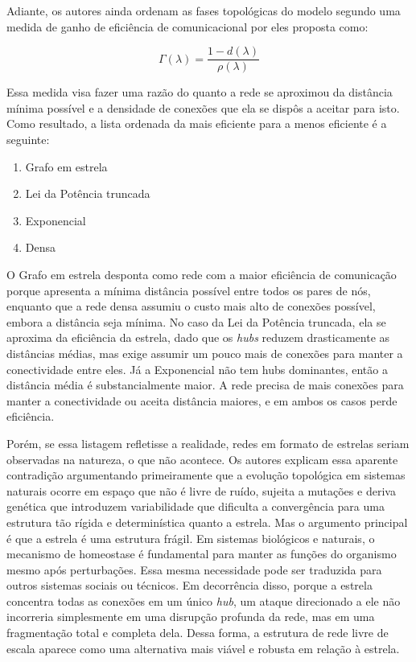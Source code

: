 \documentclass[12pt,oneside,a4paper,brazil,sumario=tradicional]{abntex2}
\begin{document}
Adiante, os autores ainda ordenam as fases topológicas do modelo segundo uma medida de ganho de eficiência de comunicacional por eles proposta como:

\[\Gamma(\lambda) = \frac{1-d(\lambda)}{\rho(\lambda)}\]

Essa medida visa fazer uma razão do quanto a rede se aproximou da distância mínima possível e a densidade de conexões que ela se dispôs a aceitar para isto. Como resultado, a lista ordenada da mais eficiente para a menos eficiente é a seguinte:

\begin{enumerate}
  \item Grafo em estrela
  \item Lei da Potência truncada
  \item Exponencial
  \item Densa
\end{enumerate}
O Grafo em estrela desponta como rede com a maior eficiência de comunicação porque apresenta a mínima distância possível entre todos os pares de nós, enquanto que a rede densa assumiu o custo mais alto de conexões possível, embora a distância seja mínima. No caso da Lei da Potência truncada, ela se aproxima da eficiência da estrela, dado que os \textit{hubs }reduzem drasticamente as distâncias médias, mas exige assumir um pouco mais de conexões para manter a conectividade entre eles. Já a Exponencial não tem hubs dominantes, então a distância média é substancialmente maior. A rede precisa de mais conexões para manter a conectividade ou aceita distância maiores, e em ambos os casos perde eficiência.

Porém, se essa listagem refletisse a realidade, redes em formato de estrelas seriam observadas na natureza, o que não acontece. Os autores explicam essa aparente contradição argumentando primeiramente que a evolução topológica em sistemas naturais ocorre em espaço que não é livre de ruído, sujeita a mutações e deriva genética que introduzem variabilidade que dificulta a convergência para uma estrutura tão rígida e determinística quanto a estrela. Mas o argumento principal é que a estrela é uma estrutura frágil. Em sistemas biológicos e naturais, o mecanismo de homeostase é fundamental para manter as funções do organismo mesmo após perturbações. Essa mesma necessidade pode ser traduzida para outros sistemas sociais ou técnicos. Em decorrência disso, porque a estrela concentra todas as conexões em um único \textit{hub}, um ataque direcionado a ele não incorreria simplesmente em uma disrupção profunda da rede, mas em uma fragmentação total e completa dela. Dessa forma, a estrutura de rede livre de escala aparece como uma alternativa mais viável e robusta em relação à estrela.
\end{document}
